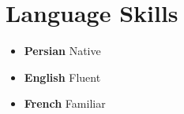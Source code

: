 \documentclass[10pt,a4paper,sans]{moderncv} %
\begin{document}
\section{Language Skills}

\begin{itemize}
\item \textbf{Persian} \hspace{5 pt} Native
\item \textbf{English} \hspace{6 pt} Fluent   
\item \textbf{French} \hspace{6 pt} Familiar   
\end{itemize} 

\end{document}

